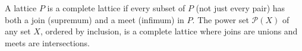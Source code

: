 A lattice $P$ is a complete lattice if every subset of $P$ (not just every pair) has both a join (supremum) and a meet (infimum) in $P$. The power set $\mathcal{P}(X)$ of any set $X$, ordered by inclusion, is a complete lattice where joins are unions and meets are intersections.
